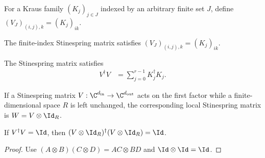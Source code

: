 \begin{definition}
    \label{def:stinespring_v_gen}
    \leanok
    For a Kraus family $(K_j)_{j\in J}$ indexed by an arbitrary finite set
    $J$, define $(V_J)_{(i,j),k}=(K_j)_{ik}$.
\end{definition}

\begin{lemma}
    \label{lem:stinespring_v_gen_apply}
    \leanok
    The finite-index Stinespring matrix satisfies
    $(V_J)_{(i,j),k}=(K_j)_{ik}$.
\end{lemma}

\begin{theorem}\label{thm:stinespring_v_conjTranspose_mul}
    \leanok
    The Stinespring matrix satisfies
    \begin{align}
        V^\dagger V
        &=\sum_{j=0}^{r-1}K_j^\dagger K_j.
        \label{eq:representations_stinespring_gram}
    \end{align}
\end{theorem}

\begin{definition}\label{def:local_stinespring_v}
    \leanok
    If a Stinespring matrix $V:\C^{d_{\mathrm{in}}}\to
    \C^{d_{\mathrm{out}}}$ acts on the first factor while a finite-dimensional
    space $R$ is left unchanged, the corresponding local Stinespring matrix is
    $W=V\otimes\Id_R$.
\end{definition}

\begin{theorem}
    \label{thm:local_stinespring_v_conjTranspose_mul}
    \leanok
    If $V^\dagger V=\Id$, then
    $(V\otimes\Id_R)^\dagger(V\otimes\Id_R)=\Id$.
\end{theorem}

\begin{proof}\leanok
    Use $(A\otimes B)(C\otimes D)=AC\otimes BD$ and
    $\Id\otimes\Id=\Id$.
\end{proof}

